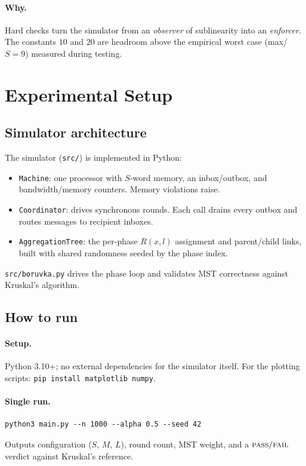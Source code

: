 \documentclass[11pt]{article}
\begin{document}
\paragraph{Why.} Hard checks turn the simulator from an \textit{observer}
of sublinearity into an \textit{enforcer}. The constants $10$ and $20$
are headroom above the empirical worst case (max/$S = 9$) measured during
testing.

\section{Experimental Setup}

\subsection{Simulator architecture}

The simulator (\texttt{src/}) is implemented in Python:
\begin{itemize}[topsep=2pt, itemsep=2pt, leftmargin=*]
    \item \texttt{Machine}: one processor with $S$-word memory, an
          inbox/outbox, and bandwidth/memory counters. Memory violations
          raise.
    \item \texttt{Coordinator}: drives synchronous rounds. Each call
          drains every outbox and routes messages to recipient inboxes.
    \item \texttt{AggregationTree}: the per-phase $R(x, l)$ assignment
          and parent/child links, built with shared randomness seeded by
          the phase index.
\end{itemize}
\texttt{src/boruvka.py} drives the phase loop and validates MST correctness
against Kruskal's algorithm.

\subsection{How to run}

\paragraph{Setup.} Python 3.10+; no external dependencies for the simulator
itself. For the plotting scripts: \texttt{pip install matplotlib numpy}.

\paragraph{Single run.}
\begin{verbatim}
python3 main.py --n 1000 --alpha 0.5 --seed 42
\end{verbatim}
Outputs configuration ($S$, $M$, $L$), round count, MST weight, and a
$\textsc{pass}/\textsc{fail}$ verdict against Kruskal's reference.
\end{document}
